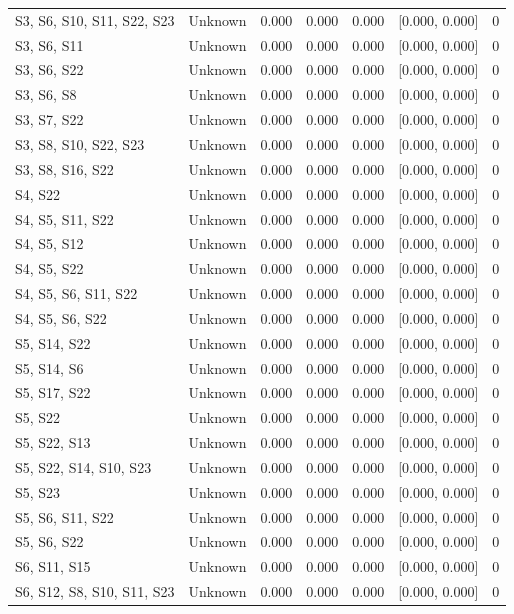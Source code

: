\begin{table}[h]
\begin{tabular}{llccccr}
S3, S6, S10, S11, S22, S23 & Unknown & 0.000 & 0.000 & 0.000 & [0.000, 0.000] & 0 \\
S3, S6, S11 & Unknown & 0.000 & 0.000 & 0.000 & [0.000, 0.000] & 0 \\
S3, S6, S22 & Unknown & 0.000 & 0.000 & 0.000 & [0.000, 0.000] & 0 \\
S3, S6, S8 & Unknown & 0.000 & 0.000 & 0.000 & [0.000, 0.000] & 0 \\
S3, S7, S22 & Unknown & 0.000 & 0.000 & 0.000 & [0.000, 0.000] & 0 \\
S3, S8, S10, S22, S23 & Unknown & 0.000 & 0.000 & 0.000 & [0.000, 0.000] & 0 \\
S3, S8, S16, S22 & Unknown & 0.000 & 0.000 & 0.000 & [0.000, 0.000] & 0 \\
S4, S22 & Unknown & 0.000 & 0.000 & 0.000 & [0.000, 0.000] & 0 \\
S4, S5, S11, S22 & Unknown & 0.000 & 0.000 & 0.000 & [0.000, 0.000] & 0 \\
S4, S5, S12 & Unknown & 0.000 & 0.000 & 0.000 & [0.000, 0.000] & 0 \\
S4, S5, S22 & Unknown & 0.000 & 0.000 & 0.000 & [0.000, 0.000] & 0 \\
S4, S5, S6, S11, S22 & Unknown & 0.000 & 0.000 & 0.000 & [0.000, 0.000] & 0 \\
S4, S5, S6, S22 & Unknown & 0.000 & 0.000 & 0.000 & [0.000, 0.000] & 0 \\
S5, S14, S22 & Unknown & 0.000 & 0.000 & 0.000 & [0.000, 0.000] & 0 \\
S5, S14, S6 & Unknown & 0.000 & 0.000 & 0.000 & [0.000, 0.000] & 0 \\
S5, S17, S22 & Unknown & 0.000 & 0.000 & 0.000 & [0.000, 0.000] & 0 \\
S5, S22 & Unknown & 0.000 & 0.000 & 0.000 & [0.000, 0.000] & 0 \\
S5, S22, S13 & Unknown & 0.000 & 0.000 & 0.000 & [0.000, 0.000] & 0 \\
S5, S22, S14, S10, S23 & Unknown & 0.000 & 0.000 & 0.000 & [0.000, 0.000] & 0 \\
S5, S23 & Unknown & 0.000 & 0.000 & 0.000 & [0.000, 0.000] & 0 \\
S5, S6, S11, S22 & Unknown & 0.000 & 0.000 & 0.000 & [0.000, 0.000] & 0 \\
S5, S6, S22 & Unknown & 0.000 & 0.000 & 0.000 & [0.000, 0.000] & 0 \\
S6, S11, S15 & Unknown & 0.000 & 0.000 & 0.000 & [0.000, 0.000] & 0 \\
S6, S12, S8, S10, S11, S23 & Unknown & 0.000 & 0.000 & 0.000 & [0.000, 0.000] & 0 \\

\end{tabular}
\end{table}
